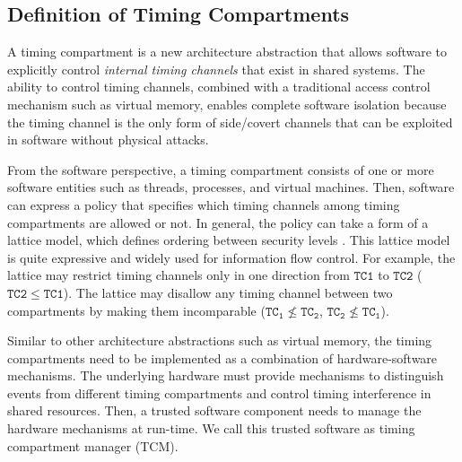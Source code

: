 \subsection{Definition of Timing Compartments}

A timing compartment is a new architecture abstraction that allows software to
explicitly control {\em internal timing channels} that exist in shared systems. 
The ability to control timing channels, combined with a traditional access
control mechanism such as virtual memory, enables complete software isolation
because the timing channel is the only form of side/covert channels that can be
exploited in software without physical attacks.

From the software perspective, a timing compartment consists of one or more software 
entities such as threads, processes, and virtual machines. 
Then, software can express a policy that specifies which timing channels among
timing compartments are allowed or not. In general, the policy can take a form
of a lattice model, which defines ordering between security levels \cite{denning}.
This lattice model is quite expressive and widely used for information flow control. 
For example, the lattice may restrict timing channels only in one direction 
from $\mathtt{TC1}$ to $\mathtt{TC2}$ ($\mathtt{TC2} \leq \mathtt{TC1}$).
The lattice may disallow any timing channel between two compartments by making
them incomparable ($\mathtt{TC_1} \nleq \mathtt{TC_2}$, $\mathtt{TC_2} \nleq \mathtt{TC_1}$).


Similar to other architecture abstractions such as virtual memory, the
timing compartments need to be implemented as a combination of hardware-software
mechanisms. The underlying hardware must provide mechanisms to distinguish
events from different timing compartments and control timing interference 
in shared resources.
Then, a trusted software component needs to manage the hardware mechanisms 
at run-time. We call this trusted software as timing compartment manager (TCM).


